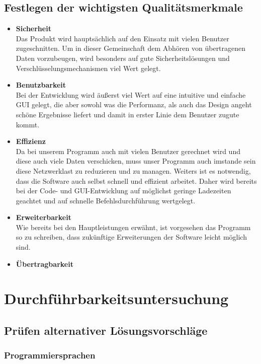 \documentclass[a4paper,12pt]{scrreprt}
\begin{document}
	\section{Festlegen der wichtigsten Qualit\"atsmerkmale}
		\begin{itemize}
			\item {\LARGE\textbf{Sicherheit}}\\
			Das Produkt wird hauptsächlich auf den Einsatz mit vielen Benutzer zugeschnitten. Um in dieser Gemeinschaft dem Abhören von übertragenen Daten vorzubeugen, wird besonders auf gute Sicherheitslösungen und Verschlüsselungsmechanismen viel Wert gelegt.
			\item {\LARGE\textbf{Benutzbarkeit}}\\
			Bei der Entwicklung wird äußerst viel Wert auf eine intuitive und einfache GUI gelegt, die aber sowohl was die Performanz, als auch das Design angeht schöne Ergebnisse liefert und damit in erster Linie dem Benutzer zugute kommt.
			\item {\LARGE\textbf{Effizienz}}\\
			Da bei unserem Programm auch mit vielen Benutzer gerechnet wird und diese auch viele Daten verschicken, muss unser Programm auch imstande sein diese Netzwerklast zu reduzieren und zu managen. Weiters ist es notwendig, dass die Software auch selbst schnell und effizient arbeitet. Daher wird bereits bei der Code- und GUI-Entwicklung auf möglichst geringe Ladezeiten geachtet und auf schnelle Befehlsdurchführung wertgelegt.
			\item {\LARGE\textbf{Erweiterbarkeit}}\\
			Wie bereits bei den Hauptleistungen erwähnt, ist vorgesehen das Programm so zu schreiben, dass zukünftige Erweiterungen der Software leicht möglich sind.
			\item {\LARGE\textbf{Übertragbarkeit}}	\\
			\end{itemize}
\chapter{Durchf\"uhrbarkeitsuntersuchung}
	
	\section{Pr\"ufen alternativer L\"osungsvorschl\"age}
	
		\subsection{Programmiersprachen}
		
\end{document}
